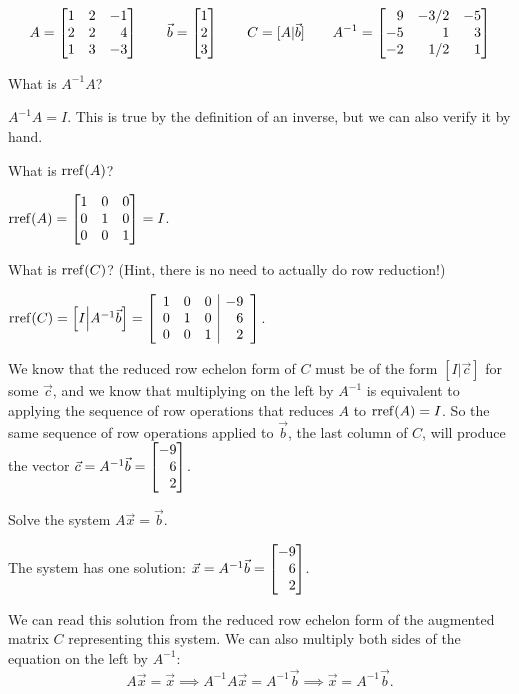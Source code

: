 \documentclass{problemset}
\begin{document}
	\[
		A=\mat{1&2&-1\\2&2&4\\1&3&-3}\qquad
		\vec b=\mat{1\\2\\3}\qquad
		C=[A|\vec b]\qquad
		A^{-1}=\mat{9&-3/2&-5\\-5&1&3\\-2&1/2&1}
	\]
	\begin{parts}
		\item What is $A^{-1}A$?
			\begin{solution}
				$A^{-1}A = I$. This is true by the definition of an inverse,
				but we can also verify it by hand.
			\end{solution}
		\item What is $\operatorname{rref}(A)$?
			\begin{solution}
				$\rref(A) = \mat{1&0&0\\0&1&0\\0&0&1} = I$.
			\end{solution}
		\item What is $\operatorname{rref}(C)$? (Hint, there is no need to actually do row reduction!)
			\begin{solution}
				$\operatorname{rref}(C) = \left[I\middle|A^{-1}\vec b\right]
				=\left[
					\begin{array}{rrr|r}
						1&0&0&-9\\
						0&1&0&6\\
						0&0&1&2
					\end{array}
				\right]$.

				We know that the reduced row echelon form of $C$ must be of the
				form $[I|\vec c]$ for some $\vec c$, and we know that multiplying
				on the left by $A^{-1}$ is equivalent to applying the sequence of
				row operations that reduces $A$ to $\operatorname{rref}(A)=I$. So the same sequence
				of row operations applied to $\vec b$, the last column of $C$,
				will produce the vector $\vec c=A^{-1}\vec b=\mat{-9\\6\\2}$.
			\end{solution}

		\item Solve the system $A\vec x=\vec b$.
			\begin{solution}
				The system has one solution: $\vec x=A^{-1}\vec b=\mat{-9\\6\\2}$.

				We can read this solution from the reduced row echelon form of the
				augmented matrix $C$ representing this system. We can also multiply
				both sides of the equation on the left by $A^{-1}$:
				\[
					A\vec x=\vec x
					\implies A^{-1}A\vec x=A^{-1}\vec b
					\implies \vec x=A^{-1}\vec b.
				\]
			\end{solution}
	\end{parts}
\end{document}
